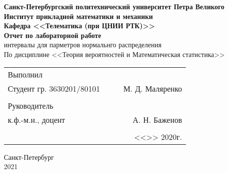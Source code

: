 \documentclass[12pt]{article}
\begin{document}
\begin{titlepage}
	\begin{center}
		\hfill \break
		{\textbf{Санкт-Петербургский политехнический университет Петра Великого}}\\
		\hfill \break
		\textbf{Институт прикладной математики и механики}\\
		 \hfill \break
		\textbf{Кафедра <<Телематика (при ЦНИИ РТК)>>}\\
		\vfill
		\large{\bfseries Отчет по лабораторной работе}\\
		\hfill \break
		\hfill \break
		\hfill \break
		\hfill \break
        \normalsize{ интервалы для парметров нормальнго распределения}\\
        \hfill \break
		По дисциплине <<Теория вероятностей и Математическая статистика>>\\
		\hfill \break
		\hfill \break
	\end{center}
 
	\normalsize
	{ 
		\begin{tabular}{lp{2cm}cr}
			Выполнил &&&\\
			Студент гр. 3630201/80101&&\underline{\hspace{1.5cm}}& М. Д. Маляренко\\\\
			Руководитель&&&\\ 
			к.ф.-м.н., доцент && \underline{\hspace{1.5cm}}& А. Н. Баженов \\\\
			&&&<<\underline{\phantom{333}}>>\underline{\phantom{сентября000}}
			2020г.
		\end{tabular}
	}
\vfill

\begin{center} Санкт-Петербург \\2021 \end{center}
\end{titlepage}

\newpage

\setcounter{page}{2}
\end{document}
